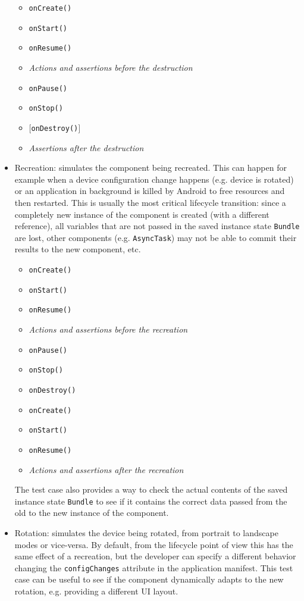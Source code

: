 \documentclass[11pt,a4paper,notitlepage]{article}
\begin{document}
\begin{itemize}
	\begin{itemize}
		\item \texttt{onCreate()}
		\item \texttt{onStart()}
		\item \texttt{onResume()}
     	\item \textit{Actions and assertions before the destruction}
		\item \texttt{onPause()}
		\item \texttt{onStop()}
		\item $[$\texttt{onDestroy()}$]$
     	\item \textit{Assertions after the destruction}
	\end{itemize}
	\item Recreation: simulates the component being recreated. This can happen for example when a device configuration change happens (e.g. device is rotated) or an application in background is killed by Android to free resources and then restarted. This is usually the most critical lifecycle transition: since a completely new instance of the component is created (with a different reference), all variables that are not passed in the saved instance state \texttt{Bundle} are lost, other components (e.g. \texttt{AsyncTask}) may not be able to commit their results to the new component, etc.  
	\begin{itemize}
		\item \texttt{onCreate()}
		\item \texttt{onStart()}
		\item \texttt{onResume()}
     	\item \textit{Actions and assertions before the recreation}
		\item \texttt{onPause()}
		\item \texttt{onStop()}
		\item \texttt{onDestroy()}
		\item \texttt{onCreate()}
		\item \texttt{onStart()}
		\item \texttt{onResume()}
     	\item \textit{Actions and assertions after the recreation}
	\end{itemize}
	The test case also provides a way to check the actual contents of the saved instance state \texttt{Bundle} to see if it contains the correct data passed from the old to the new instance of the component.
	\item Rotation: simulates the device being rotated, from portrait to landscape modes or vice-versa. By default, from the lifecycle point of view this has the same effect of a recreation, but the developer can specify a different behavior changing the \texttt{configChanges} attribute in the application manifest. This test case can be useful to see if the component dynamically adapts to the new rotation, e.g. providing a different UI layout.

\end{itemize}
\end{document}
